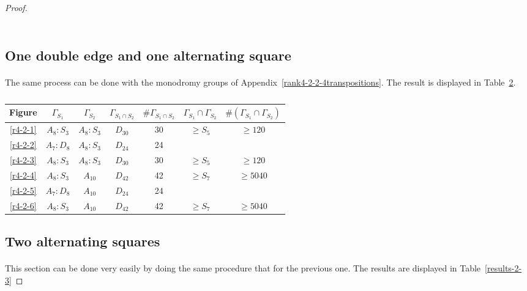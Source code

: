 \begin{proof}
\begin{table}
\begin{tabular}{|c|c|c|c|c|c|c|}
  \end{tabular}
  \caption{}
  \label{results-2-1}
\end{table}

\subsection{One double edge and one alternating square}

  \paragraph{}
  The same process can be done with the monodromy groups of Appendix~\ref{rank4-2-2-4transpositions}. The result is displayed in Table~\ref{results-2-2}.

  \begin{table}
    \centering
    \begin{tabular}{|c|c|c|c|c|c|c|}
      \hline
      Figure & $\Gamma_{S_1}$ & $\Gamma_{S_2}$ & $\Gamma_{S_1 \cap S_2}$ & $\#\Gamma_{S_1 \cap S_2}$ & $\Gamma_{S_1} \cap \Gamma_{S_2}$ & $\#(\Gamma_{S_1} \cap \Gamma_{S_2})$ \\ \hline

      \ref{r4-2-1} & $A_8 : S_3$ & $A_8 : S_3 $ & $D_{30}$ & 30 & $\ge S_5$ & $\ge 120$ \\ \hline
      \ref{r4-2-2} & $A_7 : D_8$ & $A_8 : S_3$ & $D_{24}$ & 24 & & \\ \hline
      \ref{r4-2-3} & $A_8 : S_3$ & $A_8 : S_3 $ & $D_{30}$ & 30 & $\ge S_5$ & $\ge 120$ \\ \hline
      \ref{r4-2-4} & $A_8 : S_3$ & $A_{10}$ & $D_{42}$ & 42 & $\ge S_7$ & $\ge 5040$ \\ \hline
      \ref{r4-2-5} & $A_7 : D_8$ & $A_{10}$ & $D_{24}$ & 24 & & \\ \hline
      \ref{r4-2-6} & $A_8 : S_3$ & $A_{10}$ & $D_{42}$ & 42 & $\ge S_7$ & $\ge 5040$ \\ \hline
        \end{tabular}
    \caption{}
    \label{results-2-2}
  \end{table}

\subsection{Two alternating squares}
  \paragraph{}
  This section can be done very easily by doing the same procedure that for the previous one. The results are displayed in Table~\ref{results-2-3}


\end{proof}

